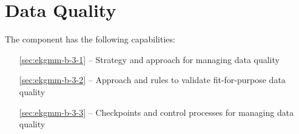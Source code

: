 \chapter{Data Quality}\label{ch:ekgmm-b-3} %

The  component has the following capabilities:

\begin{itemize}[leftmargin=.5in]
  \item [\ref{sec:ekgmm-b-3-1}]  -- Strategy and approach for managing data quality
  \item [\ref{sec:ekgmm-b-3-2}]  -- Approach and rules to validate fit-for-purpose data quality
  \item [\ref{sec:ekgmm-b-3-3}]  -- Checkpoints and control processes for managing data quality
\end{itemize}




